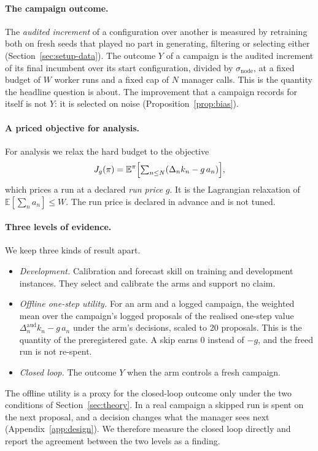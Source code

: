 \paragraph{The campaign outcome.}
The \emph{audited increment} of a configuration over another is measured by retraining both on fresh seeds that played no part in generating, filtering or selecting either (Section~\ref{sec:setup-data}). The outcome $Y$ of a campaign is the audited increment of its final incumbent over its start configuration, divided by $\sigma_{\mathrm{node}}$, at a fixed budget of $W$ worker runs and a fixed cap of $N$ manager calls. This is the quantity the headline question is about. The improvement that a campaign records for itself is not $Y$: it is selected on noise (Proposition~\ref{prop:bias}).

\paragraph{A priced objective for analysis.}
For analysis we relax the hard budget to the objective
\[
J_g(\pi)=\mathbb{E}^\pi\Bigl[\textstyle\sum_{n\le N}(\Delta_n k_n-g\,a_n)\Bigr],
\]
which prices a run at a declared \emph{run price} $g$. It is the Lagrangian relaxation of $\mathbb{E}[\sum_n a_n]\le W$. The run price is declared in advance and is not tuned.

\paragraph{Three levels of evidence.}
We keep three kinds of result apart.
\begin{itemize}
\item \emph{Development.} Calibration and forecast skill on training and development instances. They select and calibrate the arms and support no claim.
\item \emph{Offline one-step utility.} For an arm and a logged campaign, the weighted mean over the campaign's logged proposals of the realised one-step value $\Delta^{\mathrm{aud}}_n k_n-g\,a_n$ under the arm's decisions, scaled to 20 proposals. This is the quantity of the preregistered gate. A skip earns $0$ instead of $-g$, and the freed run is not re-spent.
\item \emph{Closed loop.} The outcome $Y$ when the arm controls a fresh campaign.
\end{itemize}
The offline utility is a proxy for the closed-loop outcome only under the two conditions of Section~\ref{sec:theory}. In a real campaign a skipped run is spent on the next proposal, and a decision changes what the manager sees next (Appendix~\ref{app:design}). We therefore measure the closed loop directly and report the agreement between the two levels as a finding.
